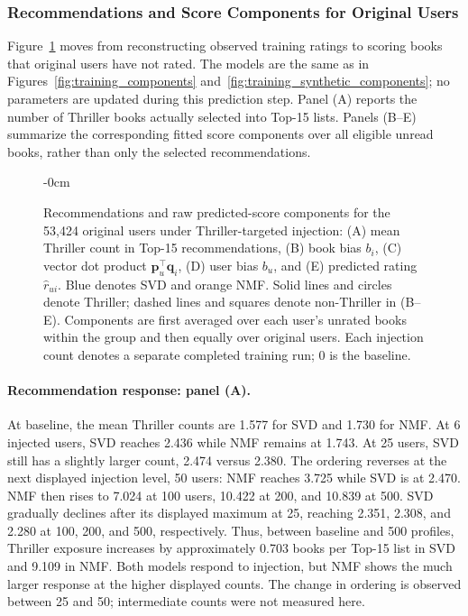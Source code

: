 \subsubsection{Recommendations and Score Components for Original Users}
\label{sec:real-user-prediction}

Figure~\ref{fig:prediction_real_users} moves from reconstructing observed training ratings to scoring books that original users have not rated. The models are the same as in Figures~\ref{fig:training_components} and~\ref{fig:training_synthetic_components}; no parameters are updated during this prediction step. Panel (A) reports the number of Thriller books actually selected into Top-15 lists. Panels (B--E) summarize the corresponding fitted score components over all eligible unread books, rather than only the selected recommendations.

\begin{figure}[htbp]
\begin{adjustwidth}{-\extralength}{0cm}
\centering
{}
\end{adjustwidth}
\caption{Recommendations and raw predicted-score components for the 53,424 original users under Thriller-targeted injection: (A) mean Thriller count in Top-15 recommendations, (B) book bias $b_i$, (C) vector dot product $\mathbf p_u^\top\mathbf q_i$, (D) user bias $b_u$, and (E) predicted rating $\hat r_{ui}$. Blue denotes SVD and orange NMF. Solid lines and circles denote Thriller; dashed lines and squares denote non-Thriller in (B--E). Components are first averaged over each user's unrated books within the group and then equally over original users. Each injection count denotes a separate completed training run; 0 is the baseline.}
\label{fig:prediction_real_users}
\end{figure}

\paragraph{Recommendation response: panel (A).}
At baseline, the mean Thriller counts are 1.577 for SVD and 1.730 for NMF. At 6 injected users, SVD reaches 2.436 while NMF remains at 1.743. At 25 users, SVD still has a slightly larger count, 2.474 versus 2.380. The ordering reverses at the next displayed injection level, 50 users: NMF reaches 3.725 while SVD is at 2.470. NMF then rises to 7.024 at 100 users, 10.422 at 200, and 10.839 at 500. SVD gradually declines after its displayed maximum at 25, reaching 2.351, 2.308, and 2.280 at 100, 200, and 500, respectively. Thus, between baseline and 500 profiles, Thriller exposure increases by approximately 0.703 books per Top-15 list in SVD and 9.109 in NMF. Both models respond to injection, but NMF shows the much larger response at the higher displayed counts. The change in ordering is observed between 25 and 50; intermediate counts were not measured here.

